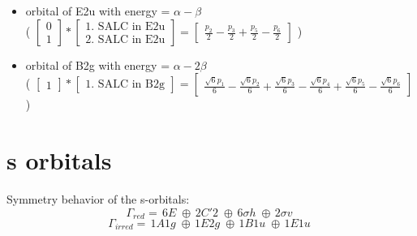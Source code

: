 \documentclass[12pt,a4paper]{article}
\begin{document}
\begin{itemize}
\item orbital of E2u with energy = $\alpha - \beta$ \\
                            ( $\left[\begin{matrix}0\\1\end{matrix}\right] * \left[\begin{array}{c}\text{1. SALC in E2u} \\ \text{2. SALC in E2u}\end{array}\right] = \left[\begin{matrix}\frac{p_{2}}{2} - \frac{p_{3}}{2} + \frac{p_{5}}{2} - \frac{p_{6}}{2}\end{matrix}\right] $ )
\item orbital of B2g with energy = $\alpha - 2 \beta$ \\
                            ( $\left[\begin{matrix}1\end{matrix}\right] * \left[\begin{array}{c}\text{1. SALC in B2g}\end{array}\right] = \left[\begin{matrix}\frac{\sqrt{6} p_{1}}{6} - \frac{\sqrt{6} p_{2}}{6} + \frac{\sqrt{6} p_{3}}{6} - \frac{\sqrt{6} p_{4}}{6} + \frac{\sqrt{6} p_{5}}{6} - \frac{\sqrt{6} p_{6}}{6}\end{matrix}\right] $ )
\end{itemize}



\newpage \section*{s orbitals}
Symmetry behavior of the s-orbitals:
$$\Gamma_{red} = \,6 E\;\oplus{}\,2 C'2\;\oplus{}\,6 \sigma h\;\oplus{}\,2 \sigma v\;$$
$$\Gamma_{irred} = \,1 A1g\;\oplus{}\,1 E2g\;\oplus{}\,1 B1u\;\oplus{}\,1 E1u\;$$
\end{document}
